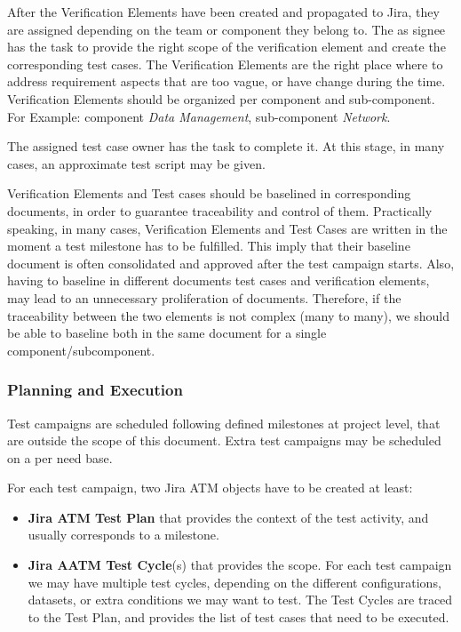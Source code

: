 After the Verification Elements have been created and propagated to Jira, they are assigned depending on the team or
component they belong to.
The as signee has the task to provide the right scope of the verification element and create the corresponding test cases.
The Verification Elements are the right place where to address requirement aspects that are too vague, or have change during the time.
Verification Elements should be organized per component and sub-component. 
For Example: component \textit{Data Management}, sub-component \textit{Network}.

The assigned test case owner has the task to complete it. At this stage, in many cases, an approximate test script may be given.

Verification Elements and Test cases should be baselined in corresponding documents, in order to guarantee traceability and control of them.
Practically speaking, in many cases, Verification Elements and Test Cases are written in the moment a test milestone has to be fulfilled.
This imply that their baseline document is often consolidated and approved after the test campaign starts.
Also, having to baseline in different documents test cases and verification elements, may lead to an unnecessary proliferation of documents.
Therefore, if the traceability between the two elements is not complex (many to many), we should be able to baseline both in the same document
for a single component/subcomponent.


\subsubsection{Planning and Execution}

Test campaigns are scheduled following defined milestones at project level, that are outside the scope of this document.
Extra test campaigns may be scheduled on a per need base.

For each test campaign, two Jira ATM objects have to be created at least:

\begin{itemize}
\item \textbf{Jira ATM Test Plan} that provides the context of the test activity, and usually corresponds to a milestone.
\item \textbf{Jira AATM Test Cycle}(s) that provides the scope. For each test campaign we may have multiple test cycles, 
depending on the different configurations, datasets, or extra conditions we may want to test. The Test Cycles are traced
to the Test Plan, and provides the list of test cases that need to be executed.
\end{itemize}

